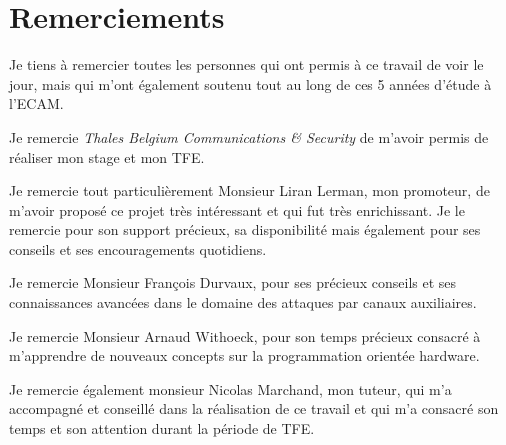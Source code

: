 \documentclass[oneside]{book}
\begin{document}
\newpage
\strut
\thispagestyle{empty}
\newpage



\chapter*{Remerciements}

Je tiens à remercier toutes les personnes qui ont permis à ce travail de voir le jour, mais qui m’ont également soutenu tout au long de ces 5 années d’étude à l’ECAM.

Je remercie \textit{Thales Belgium Communications \& Security} de m’avoir permis de réaliser mon stage et mon TFE.

Je remercie tout particulièrement Monsieur Liran Lerman, mon promoteur, de m’avoir proposé ce projet très intéressant et qui fut très enrichissant. Je le remercie pour son support précieux, sa disponibilité mais également pour ses conseils et ses encouragements quotidiens.

Je remercie Monsieur François Durvaux, pour ses précieux conseils et ses connaissances avancées dans le domaine des attaques par canaux auxiliaires.

Je remercie Monsieur Arnaud Withoeck, pour son temps précieux consacré à m'apprendre de nouveaux concepts sur la programmation orientée hardware. 

Je remercie également monsieur Nicolas Marchand, mon tuteur, qui m’a accompagné et conseillé dans la réalisation de ce travail et qui m’a consacré son temps et son attention durant la période de TFE.

\newpage


{} %





\newpage


\tableofcontents
\newpage
\end{document}

